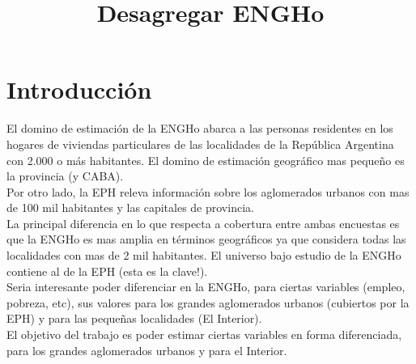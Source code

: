 \documentclass[11pt,spanish]{article}
\title{Desagregar ENGHo}
\date{\vspace{-5ex}}
\begin{document}
\maketitle
\section{Introducción}
El domino de estimación de la ENGHo  abarca a las personas residentes en los hogares de viviendas particulares de las localidades de la República Argentina con 2.000 o más habitantes. El domino de estimación geográfico mas pequeño es la provincia (y CABA).\\
Por otro lado, la EPH releva información sobre los aglomerados urbanos con mas de 100 mil habitantes y las capitales de provincia.\\
La principal diferencia en lo que respecta a cobertura entre ambas encuestas es que la ENGHo es mas amplia en términos geográficos ya que considera todas las localidades con mas de 2 mil habitantes. El universo bajo estudio de la ENGHo contiene al de la EPH (esta es la clave!).\\
Seria interesante poder diferenciar en la ENGHo, para ciertas variables (empleo, pobreza, etc), sus valores para los grandes aglomerados urbanos (cubiertos por la EPH) y para las pequeñas localidades (El Interior). \\
El objetivo del trabajo es poder estimar ciertas variables en forma diferenciada, para los grandes aglomerados urbanos y para el Interior. 
\end{document}
